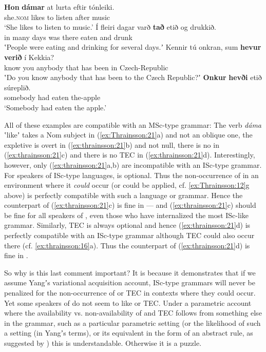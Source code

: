 \documentclass[output=paper]{LSP/langsci}
\begin{document}
\ea%
    \label{ex:Thrainsson:21}\label{ex:thrainsson:21}
    \ea
    \gll \textbf{Hon}    \textbf{dámar} at   lurta   eftir   tónleiki.\\
      she\textsc{.nom}  likes    to  listen  after  music\\
	\glt ‘She likes to listen to music.’
	\ex
	\gll Í   fleiri   dagar varð   \textbf{tað} etið   og     drukkið. \\
      in  many  days  was  there  eaten  and  drunk\\
	\glt ʽPeople were eating and drinking for several days.ʼ
	\ex
	\gll Kennir   tú     onkran,   sum   \textbf{hevur} \textbf{verið}  í   Kekkia?\\
	     know    you  anybody   that   has     been  in  Czech-Republic\\
	\glt ʽDo you know anybody that has been to the Czech Republic?ʼ
	\ex
	\gll \textbf{Onkur}     \textbf{hevði}   etið   súreplið.\\
      somebody  had    eaten  the-apple\\
	\glt      ‘Somebody had eaten the apple.’
	\z
\z

All of these examples are compatible with an MSc-type grammar: The verb \textit{dáma} ʽlikeʼ takes a Nom subject in (\ref{ex:Thrainsson:21}a) and not an oblique one, the expletive is overt in (\ref{ex:thrainsson:21}b) and not null, there is no  in (\ref{ex:thrainsson:21}c) and there is no TEC in (\ref{ex:thrainsson:21}d). Interestingly, however, only (\ref{ex:thrainsson:21}a,b) are incompatible with an ISc-type grammar. For speakers of ISc-type languages,  is optional. Thus the non-occurrence of  in an environment where it \textit{could} occur (or could be applied, cf. \ref{ex:Thrainsson:12}g above) is perfectly compatible with such a language or grammar. Hence the counterpart of (\ref{ex:thrainsson:21}c) is fine in  — and (\ref{ex:thrainsson:21}c) should be fine for all speakers of , even those who have internalized the most ISc-like grammar. Similarly, TEC is always optional and hence (\ref{ex:thrainsson:21}d) is perfectly compatible with an ISc-type grammar although TEC could also occur there (cf. \ref{ex:thrainsson:16}a). Thus the counterpart of (\ref{ex:thrainsson:21}d) is fine in .

\largerpage
So why is this last comment important? It is because it demonstrates that if we assume Yangʼs variational acquisition account, ISc-type grammars will never be penalized for the non-occurrence of  or TEC in contexts where they could occur. Yet some speakers of  do not seem to like  or TEC. Under a parametric account where the availability vs. non-availability of  and TEC follows from something else in the grammar, such as a particular parametric setting (or the likelihood of such a setting (in Yangʼs terms), or its equivalent in the form of an abstract rule, as suggested by \citealt{Newmeyer2006}) this is understandable. Otherwise it is a puzzle.
\end{document}
